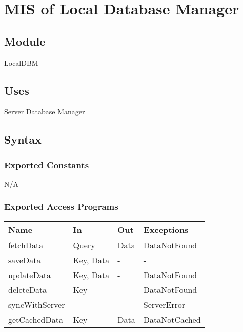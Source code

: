 \documentclass[12pt, titlepage]{article}
\begin{document}
\newpage

\section{MIS of Local Database Manager} \label{local-dbm}

\subsection{Module}

LocalDBM

\subsection{Uses}

\hyperref[server-dbm]{Server Database Manager}

\subsection{Syntax}

\subsubsection{Exported Constants}

N/A

\subsubsection{Exported Access Programs}

\begin{center}
  \begin{tabular}{p{4cm} p{4cm} p{3cm} p{3cm}}
    \hline
    \textbf{Name}  & \textbf{In} & \textbf{Out} & \textbf{Exceptions} \\
    \hline
    fetchData      & Query       & Data         & DataNotFound        \\
    saveData       & Key, Data   & -            & -                   \\
    updateData     & Key, Data   & -            & DataNotFound        \\
    deleteData     & Key         & -            & DataNotFound        \\
    syncWithServer & -           & -            & ServerError         \\
    getCachedData  & Key         & Data         & DataNotCached       \\
    \hline
  \end{tabular}
\end{center}
\end{document}
